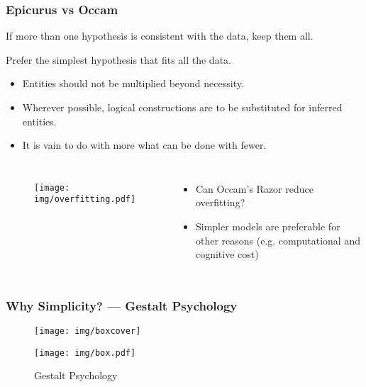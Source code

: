 \documentclass[UTF8,11pt,colorlinks,compress,openany]{beamer}%
\begin{document}
\begin{frame}\frametitle{Epicurus vs Occam}
	\begin{proposition}[Epicurus]
		If more than one hypothesis is consistent with the data, keep them all.
	\end{proposition}
	\begin{proposition}
		Prefer the simplest hypothesis that fits all the data.
	\end{proposition}
	\begin{itemize}
		\item Entities should not be multiplied beyond necessity.
		\item Wherever possible, logical constructions are to be substituted for inferred entities.
		\item It is vain to do with more what can be done with fewer.
	\end{itemize}
\vspace{-2ex}
\begin{columns}
	\begin{figure}[H]
			\texttt{[image: img/overfitting.pdf]}
	\end{figure}
	\begin{itemize}
		\item Can Occam's Razor reduce overfitting?
		\item Simpler models are preferable for other reasons (e.g. computational and cognitive cost)
	\end{itemize}
\end{columns}
\end{frame}

\begin{frame}\frametitle{Why Simplicity? --- Gestalt Psychology}
	\begin{center}
		\begin{figure}
		\texttt{[image: img/boxcover]}
		\end{figure}
		\begin{figure}
			\texttt{[image: img/box.pdf]}\caption{Gestalt Psychology}
		\end{figure}
	\end{center}
\end{frame}
\end{document}
